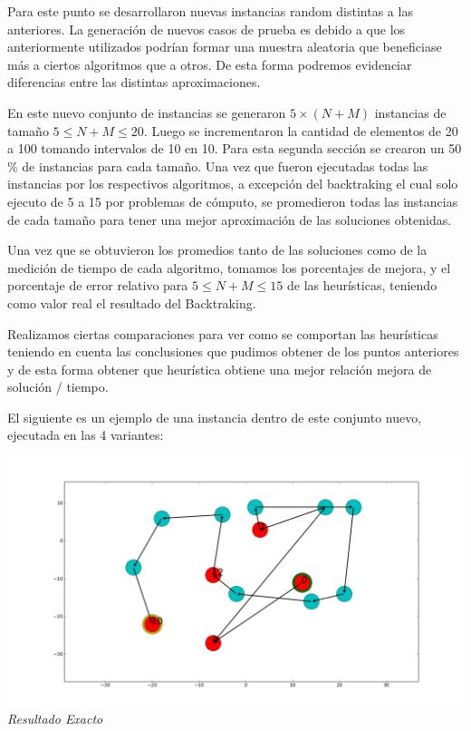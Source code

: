 Para este punto se desarrollaron nuevas instancias random distintas a las anteriores. La generación de nuevos casos de prueba es debido a que los anteriormente utilizados podrían formar una muestra aleatoria que beneficiase más a ciertos algoritmos que a otros. De esta forma podremos evidenciar diferencias entre las distintas aproximaciones.

En este nuevo conjunto de instancias se generaron $5 \times (N+M)$ instancias de tamaño $5 \leq N+M \leq 20$. Luego se incrementaron la cantidad de elementos de 20 a 100 tomando intervalos de 10 en 10. Para esta segunda secci\'on se crearon un 50$\%$ de instancias para cada tamaño.
Una vez que fueron ejecutadas todas las instancias por los respectivos algoritmos, a excepci\'on del backtraking el cual solo ejecuto de 5 a 15 por problemas de c\'omputo, se promedieron todas las instancias de cada tamaño para tener una mejor aproximaci\'on de las soluciones obtenidas. 

Una vez que se obtuvieron los promedios tanto de las soluciones como de la medici\'on de tiempo de cada algoritmo, tomamos los porcentajes de mejora, y el porcentaje de error relativo para $5 \leq N+M \leq 15$ de las heurísticas, teniendo como valor real el resultado del Backtraking.

Realizamos ciertas comparaciones para ver como se comportan las heurísticas teniendo en cuenta las conclusiones que pudimos obtener de los puntos anteriores y de esta forma obtener que heurística obtiene una mejor relación mejora de solución / tiempo.

El siguiente es un ejemplo de una instancia dentro de este conjunto nuevo, ejecutada en las 4 variantes:

 
    \vspace*{0.3cm} \vspace*{0.3cm}
  \begin{center}
\includegraphics[scale=0.3]{./EJ5/caminoExacto.png}
\\{\textit{Resultado Exacto}}
  \end{center}
  \vspace*{0.3cm}

